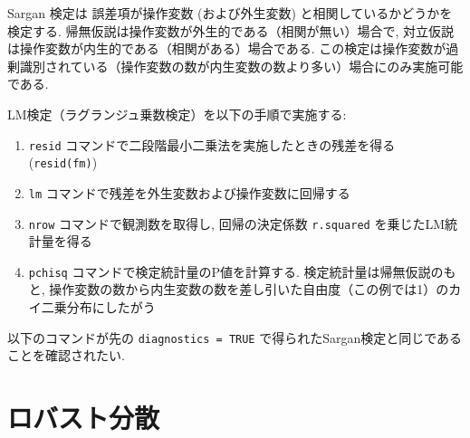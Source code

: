 \documentclass[
  letterpaper,
  xelatex,
  ja=standard, xelatex]{bxjsbook}
\newenvironment{Shaded}{\begin{snugshade}}{\end{snugshade}}
\newcommand{\AttributeTok}[1]{\textcolor[rgb]{0.40,0.45,0.13}{#1}}
\newcommand{\DecValTok}[1]{\textcolor[rgb]{0.68,0.00,0.00}{#1}}
\newcommand{\DocumentationTok}[1]{\textcolor[rgb]{0.37,0.37,0.37}{\textit{#1}}}
\newcommand{\FunctionTok}[1]{\textcolor[rgb]{0.28,0.35,0.67}{#1}}
\newcommand{\NormalTok}[1]{\textcolor[rgb]{0.00,0.23,0.31}{#1}}
\newcommand{\OtherTok}[1]{\textcolor[rgb]{0.00,0.23,0.31}{#1}}
\newcommand{\SpecialCharTok}[1]{\textcolor[rgb]{0.37,0.37,0.37}{#1}}
\providecommand{\tightlist}{%
  \setlength{\itemsep}{0pt}\setlength{\parskip}{0pt}}\usepackage{longtable,booktabs,array}
\begin{document}
Sargan 検定は 誤差項が操作変数 (および外生変数)
と相関しているかどうかを検定する.
帰無仮説は操作変数が外生的である（相関が無い）場合で,
対立仮説は操作変数が内生的である（相関がある）場合である.
この検定は操作変数が過剰識別されている（操作変数の数が内生変数の数より多い）場合にのみ実施可能である.

LM検定（ラグランジュ乗数検定）を以下の手順で実施する:

\begin{enumerate}
\def\labelenumi{\arabic{enumi}.}
\tightlist
\item
  \texttt{resid} コマンドで二段階最小二乗法を実施したときの残差を得る
  (\texttt{resid(fm)})
\item
  \texttt{lm} コマンドで残差を外生変数および操作変数に回帰する
\item
  \texttt{nrow} コマンドで観測数を取得し, 回帰の決定係数
  \texttt{r.squared} を乗じたLM統計量を得る
\item
  \texttt{pchisq} コマンドで検定統計量のP値を計算する.
  検定統計量は帰無仮説のもと,
  操作変数の数から内生変数の数を差し引いた自由度（この例では1）のカイ二乗分布にしたがう
\end{enumerate}

以下のコマンドが先の \texttt{diagnostics\ =\ TRUE}
で得られたSargan検定と同じであることを確認されたい.

\begin{Shaded}
\end{Shaded}

\section{ロバスト分散}\label{ux30edux30d0ux30b9ux30c8ux5206ux6563}
\end{document}
